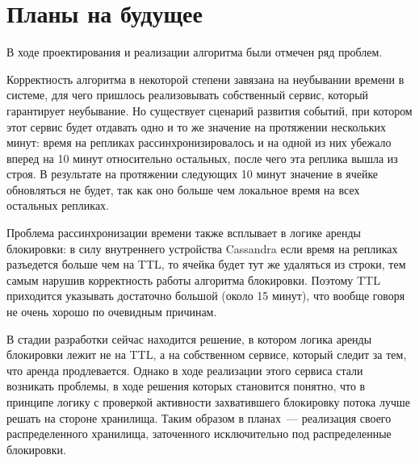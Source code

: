 \section{Планы на будущее}

В ходе проектирования и реализации алгоритма были отмечен ряд проблем.

Корректность алгоритма в некоторой степени завязана на неубывании времени в системе, для чего пришлось реализовывать собственный сервис, который гарантирует неубывание. Но существует сценарий развития событий, при котором этот сервис будет отдавать одно и то же значение на протяжении нескольких минут: время на репликах рассинхронизировалось и на одной из них убежало вперед на 10 минут относительно остальных, после чего эта реплика вышла из строя. В результате на протяжении следующих 10 минут значение в ячейке обновляться не будет, так как оно больше чем локальное время на всех остальных репликах.

Проблема рассинхронизации времени также всплывает в логике аренды блокировки: в силу внутреннего устройства Cassandra если время на репликах разъедется больше чем на TTL, то ячейка будет тут же удаляться из строки, тем самым нарушив корректность работы алгоритма блокировки. Поэтому TTL приходится указывать достаточно большой (около 15 минут), что вообще говоря не очень хорошо по очевидным причинам.

В стадии разработки сейчас находится решение, в котором логика аренды блокировки лежит не на TTL, а на собственном сервисе, который следит за тем, что аренда продлевается. Однако в ходе реализации этого сервиса стали возникать проблемы, в ходе решения которых становится понятно, что в принципе логику с проверкой активности захватившего блокировку потока лучше решать на стороне хранилища. Таким образом в планах~--- реализация своего распределенного хранилища, заточенного исключительно под распределенные блокировки.
